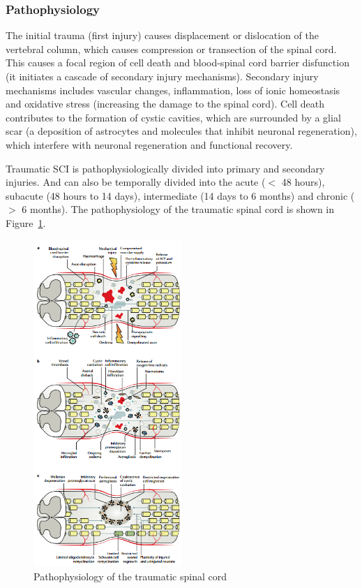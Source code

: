 \documentclass[12pt,article,oneside,a4paper]{memoir}
\begin{document}
\subsubsection{Pathophysiology}
The initial trauma (first injury) causes displacement or dislocation of the
vertebral column, which causes compression or transection of the spinal cord.
This causes a focal region of cell death and blood-spinal cord barrier
disfunction (it initiates a cascade of secondary injury mechanisms). Secondary
injury mechanisms includes vascular changes, inflammation, loss of ionic
homeostasis and oxidative stress (increasing the damage to the spinal cord).
Cell death contributes to the formation of cystic cavities, which are surrounded
by a glial scar (a deposition of astrocytes and molecules that inhibit neuronal
regeneration), which interfere with neuronal regeneration and functional recovery.

Traumatic SCI is pathophysiologically divided into primary and secondary
injuries. And can also be temporally divided into the acute ($<$ 48 hours),
subacute (48 hours to 14 days), intermediate (14 days to 6 months) and chronic
($>$ 6 months). The pathophysiology of the traumatic spinal cord is shown in
Figure~\ref{fig:SCI-pathophysiology}.

\begin{figure}
  \centering
  \includegraphics[width=0.5\textwidth]{imgs/SCI-timeline.png}
  \caption{Pathophysiology of the traumatic spinal cord}
  \label{fig:SCI-pathophysiology}
\end{figure}
\end{document}

